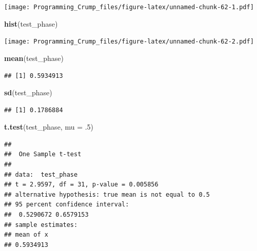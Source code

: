 \documentclass[]{book}
\newenvironment{Shaded}{\begin{snugshade}}{\end{snugshade}}
\newcommand{\KeywordTok}[1]{\textcolor[rgb]{0.13,0.29,0.53}{\textbf{{#1}}}}
\newcommand{\DataTypeTok}[1]{\textcolor[rgb]{0.13,0.29,0.53}{{#1}}}
\newcommand{\DecValTok}[1]{\textcolor[rgb]{0.00,0.00,0.81}{{#1}}}
\newcommand{\StringTok}[1]{\textcolor[rgb]{0.31,0.60,0.02}{{#1}}}
\newcommand{\NormalTok}[1]{{#1}}
\theoremstyle{definition}
\theoremstyle{definition}
\theoremstyle{definition}
\theoremstyle{remark}
\begin{document}
\begin{Shaded}
\end{Shaded}

\texttt{[image: Programming\_Crump\_files/figure-latex/unnamed-chunk-62-1.pdf]}

\begin{Shaded}
\begin{Highlighting}[]
\KeywordTok{hist}\NormalTok{(test_phase)}
\end{Highlighting}
\end{Shaded}

\texttt{[image: Programming\_Crump\_files/figure-latex/unnamed-chunk-62-2.pdf]}

\begin{Shaded}
\begin{Highlighting}[]
\KeywordTok{mean}\NormalTok{(test_phase)}
\end{Highlighting}
\end{Shaded}

\begin{verbatim}
## [1] 0.5934913
\end{verbatim}

\begin{Shaded}
\begin{Highlighting}[]
\KeywordTok{sd}\NormalTok{(test_phase)}
\end{Highlighting}
\end{Shaded}

\begin{verbatim}
## [1] 0.1786884
\end{verbatim}

\begin{Shaded}
\begin{Highlighting}[]
\KeywordTok{t.test}\NormalTok{(test_phase, }\DataTypeTok{mu =} \NormalTok{.}\DecValTok{5}\NormalTok{)}
\end{Highlighting}
\end{Shaded}

\begin{verbatim}
## 
##  One Sample t-test
## 
## data:  test_phase
## t = 2.9597, df = 31, p-value = 0.005856
## alternative hypothesis: true mean is not equal to 0.5
## 95 percent confidence interval:
##  0.5290672 0.6579153
## sample estimates:
## mean of x 
## 0.5934913
\end{verbatim}
\end{document}
